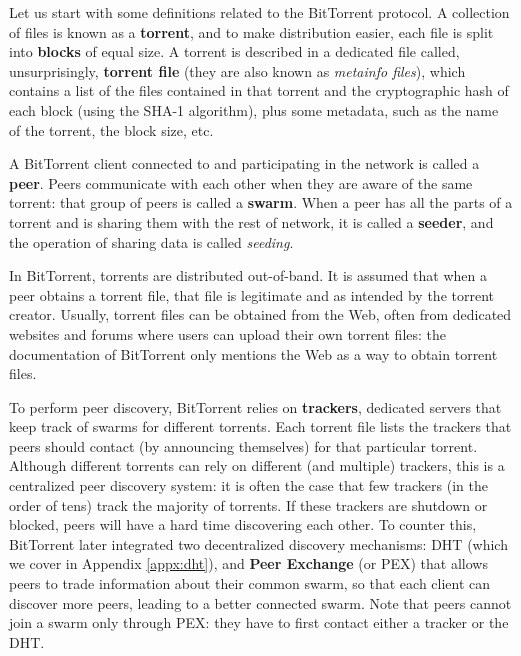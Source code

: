 \documentclass[mscthesis]{usiinfthesis}
\begin{document}
Let us start with some definitions related to the BitTorrent protocol. A collection of files is known as a \textbf{torrent}, and to make distribution easier, each file is split into \textbf{blocks} of equal size. A torrent is described in a dedicated file called, unsurprisingly, \textbf{torrent file} (they are also known as \textit{metainfo files}), which contains a list of the files contained in that torrent and the cryptographic hash of each block (using the SHA-1 algorithm), plus some metadata, such as the name of the torrent, the block size, etc.

A BitTorrent client connected to and participating in the network is called a \textbf{peer}. Peers communicate with each other when they are aware of the same torrent: that group of peers is called a \textbf{swarm}. When a peer has all the parts of a torrent and is sharing them with the rest of network, it is called a \textbf{seeder}, and the operation of sharing data is called \textit{seeding}.

In BitTorrent, torrents are distributed out-of-band. It is assumed that when a peer obtains a torrent file, that file is legitimate and as intended by the torrent creator. Usually, torrent files can be obtained from the Web, often from dedicated websites and forums where users can upload their own torrent files: the documentation of BitTorrent only mentions the Web as a way to obtain torrent files.

To perform peer discovery, BitTorrent relies on \textbf{trackers}, dedicated servers that keep track of swarms for different torrents. Each torrent file lists the trackers that peers should contact (by announcing themselves) for that particular torrent. Although different torrents can rely on different (and multiple) trackers, this is a centralized peer discovery system: it is often the case that few trackers (in the order of tens) track the majority of torrents. If these trackers are shutdown or blocked, peers will have a hard time discovering each other. To counter this, BitTorrent later integrated two decentralized discovery mechanisms: DHT (which we cover in Appendix \ref{appx:dht}), and \textbf{Peer Exchange} (or PEX) that allows peers to trade information about their common swarm, so that each client can discover more peers, leading to a better connected swarm. Note that peers cannot join a swarm only through PEX: they have to first contact either a tracker or the DHT.
\end{document}

